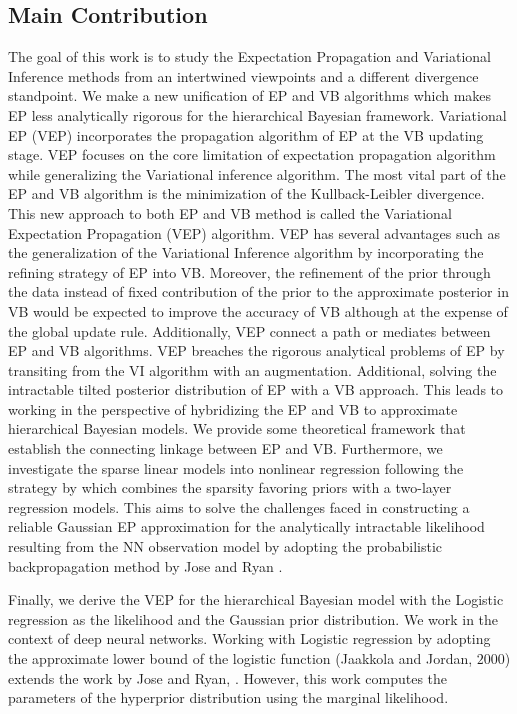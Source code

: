 \documentclass[]{article}
\begin{document}
\subsection{Main Contribution}
The goal of this work is to study the Expectation Propagation and Variational Inference methods from an intertwined viewpoints and a different divergence standpoint. We make a new unification of EP and VB algorithms which makes EP less analytically rigorous for the hierarchical Bayesian framework. Variational EP (VEP) incorporates the propagation algorithm of EP at the VB updating stage. VEP focuses on the core limitation of expectation propagation algorithm while generalizing the Variational inference algorithm. The most vital part of the EP and VB algorithm is the minimization of the Kullback-Leibler divergence. This new approach to both EP and VB method is called the Variational Expectation Propagation (VEP) algorithm. VEP has several advantages such as the generalization of the Variational Inference algorithm by incorporating the refining strategy of EP into VB. Moreover, the refinement of the prior through the data instead of fixed contribution of the prior to the approximate posterior in VB would be expected to improve the accuracy of VB although at the expense of the global update rule. Additionally, VEP connect a path or mediates between EP and VB algorithms. VEP breaches the rigorous analytical problems of EP by transiting from the VI algorithm with an augmentation. Additional, solving the intractable tilted posterior distribution of EP with a VB approach. This leads to working in the perspective of hybridizing the EP and VB to approximate hierarchical Bayesian models. We provide some theoretical framework that establish the connecting linkage between EP and VB. Furthermore, we investigate the sparse linear models into nonlinear regression following the strategy by \cite{Jylankietal2014} which combines the sparsity favoring priors with a two-layer regression models. This aims to solve the challenges faced in constructing a reliable Gaussian EP approximation for the analytically intractable likelihood resulting from the NN observation model by adopting the probabilistic backpropagation method by Jose and Ryan \cite{jose2015propagation}. \par Finally, we derive the VEP for the hierarchical Bayesian model with the Logistic regression as the likelihood and the Gaussian prior distribution. We work in the context of deep neural networks. Working with Logistic regression by adopting the approximate lower bound of the logistic function (Jaakkola and Jordan, $2000$) extends the work by Jose and Ryan, \cite{jose2015propagation}. However, this work computes the parameters of the hyperprior distribution using the marginal likelihood.
\end{document}

